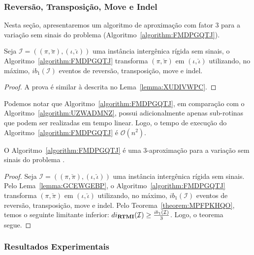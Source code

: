 \subsubsection{Reversão, Transposição, Move e Indel}

Nesta seção, apresentaremos um algoritmo de aproximação com fator $3$ para a variação sem sinais do problema \SbIRTMI{} (Algoritmo~\ref{algorithm:FMDPGQTJ}).



\begin{lemma}\label{lemma:GCEWGEBP}
Seja $\mathcal{I} = ((\pi,\breve\pi),(\iota,\breve\iota))$ uma instância intergênica rígida sem sinais, o Algoritmo~\ref{algorithm:FMDPGQTJ} transforma $(\pi,\breve\pi)$ em $(\iota,\breve\iota)$ utilizando, no máximo, $ib_1(\mathcal{I})$ eventos de reversão, transposição, move e indel.
\end{lemma}
\begin{proof}
  A prova é similar à descrita no Lema~\ref{lemma:XUDIVWPC}.
\end{proof}

Podemos notar que Algoritmo~\ref{algorithm:FMDPGQTJ}, em comparação com o Algoritmo~\ref{algorithm:UZWADMNZ}, possui adicionalmente apenas sub-rotinas que podem ser realizadas em tempo linear. Logo, o tempo de execução do Algoritmo~\ref{algorithm:FMDPGQTJ} é $\mathcal{O}(n^2)$.  

\begin{theorem}\label{theorem:NHNVPGEA}
O Algoritmo~\ref{algorithm:FMDPGQTJ} é uma $3$-aproximação para a variação sem sinais do problema \SbIRTMI{}.
\end{theorem}
\begin{proof}
Seja $\mathcal{I} = ((\pi,\breve\pi),(\iota,\breve\iota))$ uma instância intergênica rígida sem sinais. Pelo Lema~\ref{lemma:GCEWGEBP}, o Algoritmo~\ref{algorithm:FMDPGQTJ} transforma $(\pi,\breve\pi)$ em $(\iota,\breve\iota)$ utilizando, no máximo, $ib_1(\mathcal{I})$ eventos de reversão, transposição, move e indel. Pelo Teorema~\ref{theorem:MPFPKHQO}, temos o seguinte limitante inferior: $di_{\textbf{RTMI}}(\mathcal{I}) \ge \frac{ib_1(\mathcal{I})}{3}$. Logo, o teorema segue. 
\end{proof}

\subsubsection{Resultados Experimentais}\label{subsubsection:SIEYCNVZ}

